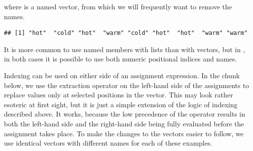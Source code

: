 \documentclass[krantz2]{krantz}\usepackage{knitr}
\begin{document}
\begin{explainbox}
where  is a named vector, from which we will frequently want to remove the names.

\begin{knitrout}\footnotesize
{}\color{fgcolor}\begin{kframe}
\begin{alltt}
 \hlkwb{<-} 
\end{alltt}
\begin{verbatim}
## [1] "hot"  "cold" "hot"  "warm" "cold" "hot"  "hot"  "warm" "warm"
\end{verbatim}
\end{kframe}
\end{knitrout}

It is more common to use named members with lists than with vectors, but in \Rlang, in both cases it is possible to use both numeric positional indices and names.
\end{explainbox}

Indexing can be used on either side of an assignment expression. In the chunk below, we use the extraction operator on the left-hand side of the assignments to replace values only at selected positions in the vector. This may look rather esoteric at first sight, but it is just a simple extension of the logic of indexing described above. It works, because the low precedence of the \Roperator{<-} operator results in both the left-hand side and the right-hand side being fully evaluated before the assignment takes place. To make the changes to the vectors easier to follow, we use identical vectors with different names for each of these examples.
\end{document}
